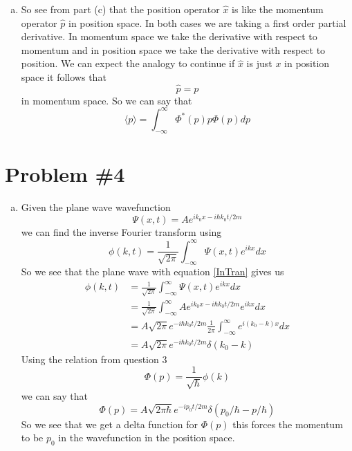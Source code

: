 \documentclass[11pt]{article}
\numberwithin{equation}{section}
\newcommand{\expt}[1]{\langle{#1}\rangle}
\begin{document}
\begin{enumerate}[(a)]
\item
So see from part (c) that the position operator $\hat{x}$ is like the momentum operator $\hat{p}$ in position space. In both cases we are taking a first order partial derivative. In momentum space we take the derivative with respect to momentum and in position space we take the derivative with respect to position. We can expect the analogy to continue if $\hat{x}$ is just $x$ in position space it follows that 
$$\hat{p} = p$$
in momentum space. So we can say that
$$\expt{p} = \int_{-\infty}^{\infty}\Phi^*(p)p\Phi(p)dp$$
\end{enumerate}

\section{Problem \#4}
\begin{enumerate}[(a)]
\item
Given the plane wave wavefunction
$$\Psi(x,t) = Ae^{ik_0x-i\hbar k_0t/2m}$$
we can find the inverse Fourier transform using
\begin{equation}
\phi(k,t) = \frac{1}{\sqrt{2\pi}}\int_{-\infty}^{\infty}\Psi(x,t)e^{ikx}dx
\label{InTran}
\end{equation}
So we see that the plane wave with equation \ref{InTran} gives us
\begin{align*}
\phi(k,t) &= \frac{1}{\sqrt{2\pi}}\int_{-\infty}^{\infty}\Psi(x,t)e^{ikx}dx\\
&= \frac{1}{\sqrt{2\pi}}\int_{-\infty}^{\infty}Ae^{ik_0x-i\hbar k_0t/2m}e^{ikx}dx\\
&= A\sqrt{2\pi}e^{-i\hbar k_0t/2m}\frac{1}{2\pi}\int_{-\infty}^{\infty}e^{i(k_0-k)x}dx\\
&= A\sqrt{2\pi}e^{-i\hbar k_0t/2m}\delta(k_0-k)
\end{align*}
Using the relation from question 3
$$\Phi(p) = \frac{1}{\sqrt{\hbar}}\phi(k)$$
we can say that
$$\Phi(p) = A\sqrt{2\pi\hbar}e^{-ip_0t/2m}\delta(p_0/\hbar - p/\hbar)$$
So we see that we get a delta function for $\Phi(p)$ this forces the momentum to be $p_0$ in the wavefunction in the position space.


\end{enumerate}
\end{document}
